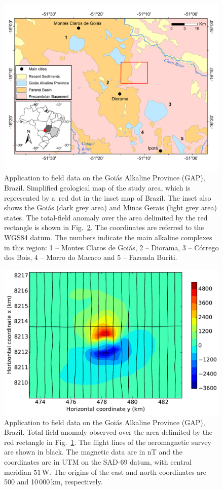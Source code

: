 \documentclass[journal abbreviation, npg]{copernicus}
\begin{document}
\begin{figure}[t]
\includegraphics[width=120mm]{Figures/npgd-2014-0069-f08}
\caption{Application to field data on the Goi\'{a}s Alkaline Province
  (GAP), Brazil. Simplified geological map of the study area, which is
  represented by a~red dot in the inset map of Brazil. The inset also
  shows the Goi\'{a}s (dark grey area) and Minas Gerais (light grey
  area) states. The total-field anomaly over the area delimited by the
  red rectangle is shown in Fig.~\ref{fig:TFA-Diorama}. The
  coordinates are referred to the WGS84 datum. The numbers indicate
  the main alkaline complexes in this region: 1 -- Montes Claros de
  Goi\'{a}s, 2 -- Diorama, 3 -- C\'{o}rrego dos Bois, 4 -- Morro do
  Macaco and 5 -- Fazenda Buriti.}
\label{fig:geology-study-area}
\end{figure}




\begin{figure}[t]
\includegraphics[width=120mm]{Figures/npgd-2014-0069-f09}
\caption{Application to field data on the Goi\'{a}s Alkaline Province (GAP),
Brazil. Total-field anomaly observed over the area delimited by the red
rectangle in Fig.~\ref{fig:geology-study-area}. The flight lines of the
aeromagnetic survey are shown in black. The magnetic data are in nT and the
coordinates are in UTM on the SAD-69 datum, with central meridian
$51${\degree}\,W. The origins of the east and north coordinates are 500 and
10\,000\,\unit{km}, respectively.} \label{fig:TFA-Diorama}
\end{figure}
\end{document}
